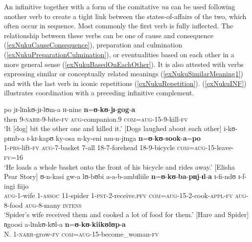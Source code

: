 \label{ComitativeInfinitive}An infinitive together with a  form of the comitative \textit{na} can be used following another verb to create a tight link between the states-of-affairs of the two, which often occur in sequence. Most commonly the first verb is fully inflected. The relationship between these verbs can be one of cause and consequence (\ref{exNukuCauseConsequence}), preparation and culmination (\ref{exNukuPreparationCulmination}), or eventualities based on each other in a more general sense (\ref{exNukuBasedOnEachOther}). It is also attested with verbs expressing similar or conceptually related meanings (\ref{exNukuSimilarMeaning1}) and with the last verb in iconic repetitions (\ref{exNukuRepetition}). (\ref{exNukuINF}) illustrates coordination with a preceding infinitive complement.
\begin{exe}
\ex \label{exNukuCauseConsequence} \gll po jɪ-lɪnkʊ-jɪ-lʊm-a ɪɪ-nine \textbf{n}=\textbf{ʊ}-\textbf{kʊ}-\textbf{jɪ}-\textbf{gog}-\textbf{a}\\
then 9-\textsc{narr}-9-bite-\textsc{fv} \textsc{aug}-companion.9 \textsc{com}=\textsc{aug}-15-9-kill-\textsc{fv}\\
\glt `It [dog] bit the other one and killed it.' [Dogs laughed about each other]
\ex \label{exNukuPreparationCulmination} \gll i-kʊ-pɪmb-a ɪ-kɪ-kapʊ ky-osa n-ky-eni mu-n-jɪnga \textbf{n}=\textbf{ʊ}-\textbf{kʊ}-\textbf{sook}-\textbf{a}=\textbf{po}\\
1-\textsc{prs}-lift-\textsc{fv} \textsc{aug}-7-basket 7-all 18-7-forehead 18-9-bicycle \textsc{com}=\textsc{aug}-15-leave-\textsc{fv}=16\\
\glt `He loads a whole basket onto the front of his bicycle and rides away.' [Elisha Pear Story]
\ex \label{exNukuBasedOnEachOther}
\gll ʊ-n-kasi gw-a lʊ-bʊbi a-a-b-ambɪliile \textbf{n}=\textbf{ʊ}-\textbf{kʊ}-\textbf{ba}-\textbf{pɪɪj}-\textbf{ɪl}-\textbf{a} ɪ-fi-ndʊ ɪ-f-ingi fiijo\\
\textsc{aug}-1-wife 1-\textsc{assoc} 11-spider 1-\textsc{pst}-2-receive.\textsc{pfv} \textsc{com}=\textsc{aug}-15-2-cook-\textsc{appl}-\textsc{fv} \textsc{aug}-8-food \textsc{aug}-8-many \textsc{intens}\\
\glt `Spider's wife received them and cooked a lot of food for them.' [Hare and Spider]
\ex \label{exNukuSimilarMeaning1}\gll n̩goosi a-lɪnkʊ-kʊl-a \textbf{n}=\textbf{ʊ}-\textbf{kʊ}-\textbf{kiikʊlʊp}-\textbf{a}\\
N. 1-\textsc{narr}-grow-\textsc{fv} \textsc{com}=\textsc{aug}-15-become\_woman-\textsc{fv}\\

\end{exe}
